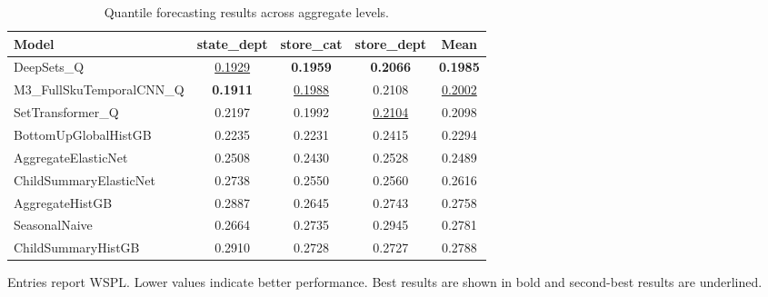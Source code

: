 \begin{table}[H]
\centering
\caption{Quantile forecasting results across aggregate levels.}
\label{tab:main_quantile}
\begin{threeparttable}
\begin{tabular}{lcccc}
\toprule
Model & state\_dept & store\_cat & store\_dept & Mean \\
\midrule
DeepSets\_Q & \underline{0.1929} & \textbf{0.1959} & \textbf{0.2066} & \textbf{0.1985} \\
M3\_FullSkuTemporalCNN\_Q & \textbf{0.1911} & \underline{0.1988} & 0.2108 & \underline{0.2002} \\
SetTransformer\_Q & 0.2197 & 0.1992 & \underline{0.2104} & 0.2098 \\
BottomUpGlobalHistGB & 0.2235 & 0.2231 & 0.2415 & 0.2294 \\
AggregateElasticNet & 0.2508 & 0.2430 & 0.2528 & 0.2489 \\
ChildSummaryElasticNet & 0.2738 & 0.2550 & 0.2560 & 0.2616 \\
AggregateHistGB & 0.2887 & 0.2645 & 0.2743 & 0.2758 \\
SeasonalNaive & 0.2664 & 0.2735 & 0.2945 & 0.2781 \\
ChildSummaryHistGB & 0.2910 & 0.2728 & 0.2727 & 0.2788 \\
\bottomrule
\end{tabular}
\begin{tablenotes}
\footnotesize \item Entries report WSPL. Lower values indicate better performance. Best results are shown in bold and second-best results are underlined.
\end{tablenotes}
\end{threeparttable}
\end{table}
